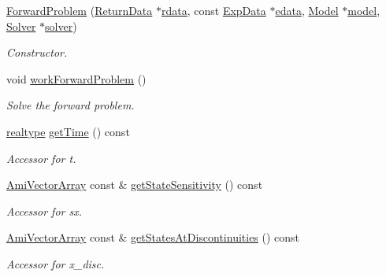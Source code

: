 \begin{DoxyCompactItemize}
\item 
\mbox{\hyperlink{classamici_1_1_forward_problem_a315030da8410dce7baa8eb1dd630994b}{Forward\+Problem}} (\mbox{\hyperlink{classamici_1_1_return_data}{Return\+Data}} $\ast$\mbox{\hyperlink{classamici_1_1_forward_problem_a4c0807651f0594a186e8856f22e442cc}{rdata}}, const \mbox{\hyperlink{classamici_1_1_exp_data}{Exp\+Data}} $\ast$\mbox{\hyperlink{classamici_1_1_forward_problem_a9ec6aee8cd7c91d0e49aed6e3d0db4ce}{edata}}, \mbox{\hyperlink{classamici_1_1_model}{Model}} $\ast$\mbox{\hyperlink{classamici_1_1_forward_problem_a7b56c3ca57dde73bdbc8dbe9772bca19}{model}}, \mbox{\hyperlink{classamici_1_1_solver}{Solver}} $\ast$\mbox{\hyperlink{classamici_1_1_forward_problem_ae1ad25a4dd6b076c27672dc94d11dad0}{solver}})
\begin{DoxyCompactList}\small\item\em Constructor. \end{DoxyCompactList}\item 
void \mbox{\hyperlink{classamici_1_1_forward_problem_a4ef001eef23bc48270159d6193036858}{work\+Forward\+Problem}} ()
\begin{DoxyCompactList}\small\item\em Solve the forward problem. \end{DoxyCompactList}\item 
\mbox{\hyperlink{namespaceamici_a1bdce28051d6a53868f7ccbf5f2c14a3}{realtype}} \mbox{\hyperlink{classamici_1_1_forward_problem_a1bc77462943aa0bae032ffa5d6e887ee}{get\+Time}} () const
\begin{DoxyCompactList}\small\item\em Accessor for t. \end{DoxyCompactList}\item 
\mbox{\hyperlink{classamici_1_1_ami_vector_array}{Ami\+Vector\+Array}} const  \& \mbox{\hyperlink{classamici_1_1_forward_problem_a3c364a12c650f9f247f664cedb6d81d3}{get\+State\+Sensitivity}} () const
\begin{DoxyCompactList}\small\item\em Accessor for sx. \end{DoxyCompactList}\item 
\mbox{\hyperlink{classamici_1_1_ami_vector_array}{Ami\+Vector\+Array}} const  \& \mbox{\hyperlink{classamici_1_1_forward_problem_ae983e618f5d4161e92b3a86f4abd1048}{get\+States\+At\+Discontinuities}} () const
\begin{DoxyCompactList}\small\item\em Accessor for x\+\_\+disc. \end{DoxyCompactList}\item 

\end{DoxyCompactItemize}
